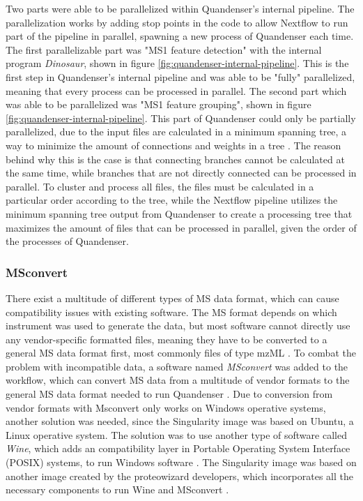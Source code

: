 Two parts were able to be parallelized within Quandenser's internal pipeline. The parallelization works by adding stop points in the code to allow Nextflow to run part of the pipeline in parallel, spawning a new process of Quandenser each time. The first parallelizable part was "MS1 feature detection" with the internal program \textit{Dinosaur}, shown in figure \ref{fig:quandenser-internal-pipeline}. This is the first step in Quandenser's internal pipeline and was able to be "fully" parallelized, meaning that every process can be processed in parallel. The second part which was able to be parallelized was "MS1 feature grouping", shown in figure \ref{fig:quandenser-internal-pipeline}. This part of Quandenser could only be partially parallelized, due to the input files are calculated in a minimum spanning tree, a way to minimize the amount of connections and weights in a tree \cite{min-span-tree}. The reason behind why this is the case is that connecting branches cannot be calculated at the same time, while branches that are not directly connected can be processed in parallel. To cluster and process all files, the files must be calculated in a particular order according to the tree, while the Nextflow pipeline utilizes the minimum spanning tree output from Quandenser to create a processing tree that maximizes the amount of files that can be processed in parallel, given the order of the processes of Quandenser.

\subsubsection{MSconvert}
There exist a multitude of different types of MS data format, which can cause compatibility issues with existing software. The MS format depends on which instrument was used to generate the data, but most software cannot directly use any vendor-specific formatted files, meaning they have to be converted to a general MS data format first, most commonly files of type mzML \cite{mzml-format}. To combat the problem with incompatible data, a software named \textit{MSconvert} was added to the workflow, which can convert MS data from a multitude of vendor formats to the general MS data format needed to run Quandenser \cite{proteowizard}. Due to conversion from vendor formats with Msconvert only works on Windows operative systems, another solution was needed, since the Singularity image was based on Ubuntu, a Linux operative system. The solution was to use another type of software called \textit{Wine}, which adds an compatibility layer in Portable Operating System Interface (POSIX) systems, to run Windows software \cite{wine}. The Singularity image was based on another image created by the proteowizard developers, which incorporates all the necessary components to run Wine and MSconvert \cite{docker-image} \cite{docker-howto}.


